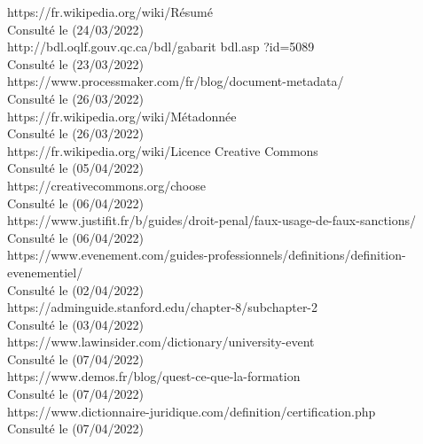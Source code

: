 \documentclass[12pt]{report}
\begin{document}
\begin{thebibliography}{99}
 https://fr.wikipedia.org/wiki/Résumé
			\\Consulté le (24/03/2022)\\

 http://bdl.oqlf.gouv.qc.ca/bdl/gabarit bdl.asp ?id=5089
			\\Consulté le (23/03/2022)\\

 https://www.processmaker.com/fr/blog/document-metadata/
			\\Consulté le (26/03/2022)\\

 https://fr.wikipedia.org/wiki/Métadonnée
			\\Consulté le (26/03/2022)\\
			
 https://fr.wikipedia.org/wiki/Licence Creative Commons
			\\Consulté le (05/04/2022)\\

 https://creativecommons.org/choose
			\\Consulté le (06/04/2022)\\
			
 https://www.justifit.fr/b/guides/droit-penal/faux-usage-de-faux-sanctions/
			\\Consulté le (06/04/2022)\\

 https://www.evenement.com/guides-professionnels/definitions/definition-evenementiel/
			\\Consulté le (02/04/2022)\\

 https://adminguide.stanford.edu/chapter-8/subchapter-2
			\\Consulté le (03/04/2022)\\


 https://www.lawinsider.com/dictionary/university-event
			\\Consulté le (07/04/2022)\\


 https://www.demos.fr/blog/quest-ce-que-la-formation
			\\Consulté le (07/04/2022)\\


 https://www.dictionnaire-juridique.com/definition/certification.php
			\\Consulté le (07/04/2022)\\



\end{thebibliography}
\end{document}
